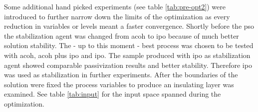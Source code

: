 Some additional hand picked experiments (see table \ref{tab:pre-opt2}) were introduced to further narrow down the limits of 
the optimization as every reduction in variables or levels meant a faster convergence.
Shortly before the \gls{pso} the stabilization agent was changed from \gls{acoh} to 
\gls{ipo} because of much better solution stability.
The - up to this moment - best process was chosen to be tested with 
 \gls{acoh},  \gls{acoh} plus  \gls{ipo} and  \gls{ipo}.
The sample produced with \gls{ipo} as stabilization agent 
showed comparable passivization results and better stability. 
Therefore \gls{ipo} was used  as stabilization in further experiments.
After the boundaries of the solution were fixed 
the process variables to produce an insulating layer was examined. 
See table \ref{tab:input} for the input space spanned during the optimization.
\iffalse
